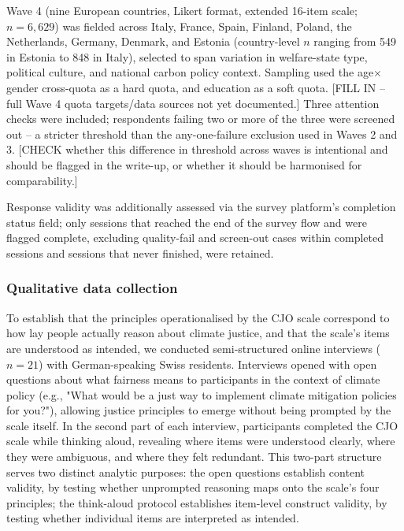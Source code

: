 \documentclass[10pt,letterpaper]{article}
\begin{document}
Wave 4 (nine European countries, Likert format, extended 16-item scale; $n = 6,629$) was fielded across Italy, France, Spain, Finland, Poland, the Netherlands, Germany, Denmark, and Estonia (country-level $n$ ranging from 549 in Estonia to 848 in Italy), selected to span variation in welfare-state type, political culture, and national carbon policy context. Sampling used the age$\times$gender cross-quota as a hard quota, and education as a soft quota. [FILL IN -- full Wave 4 quota targets/data sources not yet documented.] Three attention checks were included; respondents failing two or more of the three were screened out -- a stricter threshold than the any-one-failure exclusion used in Waves 2 and 3. [CHECK whether this difference in threshold across waves is intentional and should be flagged in the write-up, or whether it should be harmonised for comparability.]

Response validity was additionally assessed via the survey platform's completion status field; only sessions that reached the end of the survey flow and were flagged complete, excluding quality-fail and screen-out cases within completed sessions and sessions that never finished, were retained.


\subsubsection*{Qualitative data collection}

To establish that the principles operationalised by the CJO scale correspond to how lay people actually reason about climate justice, and that the scale's items are understood as intended, we conducted semi-structured online interviews ($n = 21$) with German-speaking Swiss residents.
Interviews opened with open questions about what fairness means to participants in the context of climate policy (e.g., "What would be a just way to implement climate mitigation policies for you?"), allowing justice principles to emerge without being prompted by the scale itself.
In the second part of each interview, participants completed the CJO scale while thinking aloud, revealing where items were understood clearly, where they were ambiguous, and where they felt redundant.
This two-part structure serves two distinct analytic purposes: the open questions establish content validity, by testing whether unprompted reasoning maps onto the scale's four principles; the think-aloud protocol establishes item-level construct validity, by testing whether individual items are interpreted as intended.
\end{document}
